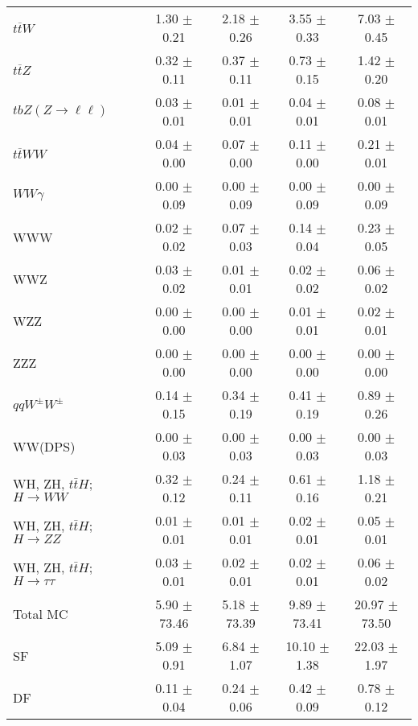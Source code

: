 \begin{tabular}{l|cccc}
                   $t\overline{t}W$ &  1.30 $\pm$  0.21 &  2.18 $\pm$  0.26 &  3.55 $\pm$  0.33 &  7.03 $\pm$  0.45 \\
                   $t\overline{t}Z$ &  0.32 $\pm$  0.11 &  0.37 $\pm$  0.11 &  0.73 $\pm$  0.15 &  1.42 $\pm$  0.20 \\
    $tbZ (Z \rightarrow \ell \ell)$ &  0.03 $\pm$  0.01 &  0.01 $\pm$  0.01 &  0.04 $\pm$  0.01 &  0.08 $\pm$  0.01 \\
                  $t\overline{t}WW$ &  0.04 $\pm$  0.00 &  0.07 $\pm$  0.00 &  0.11 $\pm$  0.00 &  0.21 $\pm$  0.01 \\
                         $WW\gamma$ &  0.00 $\pm$  0.09 &  0.00 $\pm$  0.09 &  0.00 $\pm$  0.09 &  0.00 $\pm$  0.09 \\
                                WWW &  0.02 $\pm$  0.02 &  0.07 $\pm$  0.03 &  0.14 $\pm$  0.04 &  0.23 $\pm$  0.05 \\
                                WWZ &  0.03 $\pm$  0.02 &  0.01 $\pm$  0.01 &  0.02 $\pm$  0.02 &  0.06 $\pm$  0.02 \\
                                WZZ &  0.00 $\pm$  0.00 &  0.00 $\pm$  0.00 &  0.01 $\pm$  0.01 &  0.02 $\pm$  0.01 \\
                                ZZZ &  0.00 $\pm$  0.00 &  0.00 $\pm$  0.00 &  0.00 $\pm$  0.00 &  0.00 $\pm$  0.00 \\
                 $qqW^{\pm}W^{\pm}$ &  0.14 $\pm$  0.15 &  0.34 $\pm$  0.19 &  0.41 $\pm$  0.19 &  0.89 $\pm$  0.26 \\
                            WW(DPS) &  0.00 $\pm$  0.03 &  0.00 $\pm$  0.03 &  0.00 $\pm$  0.03 &  0.00 $\pm$  0.03 \\
WH, ZH, $t\bar{t}H$; $H \rightarrow WW$ &  0.32 $\pm$  0.12 &  0.24 $\pm$  0.11 &  0.61 $\pm$  0.16 &  1.18 $\pm$  0.21 \\
WH, ZH, $t\bar{t}H$; $H \rightarrow ZZ$ &  0.01 $\pm$  0.01 &  0.01 $\pm$  0.01 &  0.02 $\pm$  0.01 &  0.05 $\pm$  0.01 \\
WH, ZH, $t\bar{t}H$; $H \rightarrow \tau\tau$ &  0.03 $\pm$  0.01 &  0.02 $\pm$  0.01 &  0.02 $\pm$  0.01 &  0.06 $\pm$  0.02 \\
\hline\hline
                           Total MC &  5.90 $\pm$ 73.46 &  5.18 $\pm$ 73.39 &  9.89 $\pm$ 73.41 & 20.97 $\pm$ 73.50 \\
\hline
                                 SF &  5.09 $\pm$  0.91 &  6.84 $\pm$  1.07 & 10.10 $\pm$  1.38 & 22.03 $\pm$  1.97 \\
                                 DF &  0.11 $\pm$  0.04 &  0.24 $\pm$  0.06 &  0.42 $\pm$  0.09 &  0.78 $\pm$  0.12 \\

\end{tabular}
